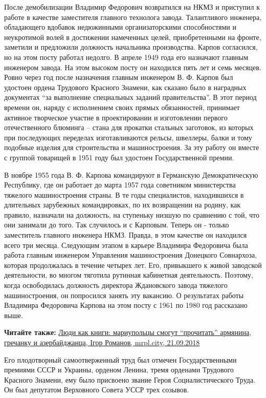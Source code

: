 После демобилизации Владимир Федорович возвратился на НКМЗ и приступил к работе
в качестве заместителя главного технолога завода. Талантливого инженера,
обладающего вдобавок недюжинными организаторскими способностями и неукротимой
волей в достижении намеченных целей, приобретенными на фронте, заметили и
предложили должность начальника производства. Карпов согласился, но на этом
посту работал недолго. В апреле 1949 года его назначают главным инженером
завода. На этом высоком посту он находился пять лет и семь месяцев. Ровно через
год после назначения главным инженером В. Ф. Карпов был удостоен ордена Трудового
Красного Знамени, как сказано было в наградных документах \enquote{за выполнение
специальных заданий правительства}. В этот период времени он, наряду с
исполнением своих прямых обязанностей, принимает активное творческое участие в
проектировании и изготовлении первого отечественного блюминга – стана для
прокатки стальных заготовок, из которых при последующих переделах
изготавливаются рельсы, швеллеры, балки и тому подобные изделия для
строительства и машиностроения. За эту работу он вместе с группой товарищей в
1951 году был удостоен Государственной премии.

В ноябре 1955 года В. Ф. Карпова командируют в Германскую Демократическую
Республику, где он работает до марта 1957 года советником министерства тяжелого
машиностроения страны. В те годы специалистов, находившихся в длительных
зарубежных командировках, по их возвращении  на родину, как правило, назначали
на должность, на ступеньку низшую по сравнению с той, что они занимали до того.
Так случилось и с Карповым. Теперь он - только заместитель главного инженера
НКМЗ. Правда, в этом качестве он находился всего три месяца. Следующим этапом в
карьере Владимира Федоровича была работа главным инженером Управления
машиностроения Донецкого Совнархоза, которая продолжалась в течение четырех
лет. Его, привыкшего к живой заводской деятельности, во многом тяготила
рутинная кабинетная деятельность. Поэтому, когда  освободилась должность
директора Ждановского завода тяжелого машиностроения, он попросился занять эту
вакансию. О результатах работы Владимира Федоровича Карпова на этом посту с
1961 по 1980 год рассказано выше.

\textbf{Читайте также:} \href{https://mrpl.city/news/view/lyudi-kak-knigi-mariupoltsy-smogut-prochitat-armyanina-grechanku-i-azerbajdzhanku}{Люди как книги: мариупольцы смогут \enquote{прочитать} армянина, гречанку и азербайджанца, Ігор Романов, mrpl.city, 21.09.2018}

Его плодотворный самоотверженный труд был отмечен Государственными премиями
СССР и Украины, орденом Ленина, тремя орденами Трудового Красного Знамени, ему
было присвоено звание Героя Социалистического Труда. Он был депутатом
Верховного Совета УССР трех созывов.

